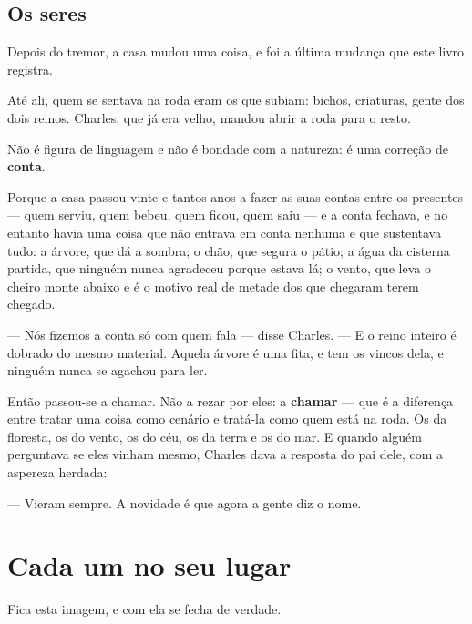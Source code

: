 \documentclass[livro.tex]{subfiles}
\begin{document}
\section{Os seres}

Depois do tremor, a casa mudou uma coisa, e foi a última mudança que este livro registra.

\medskip

Até ali, quem se sentava na roda eram os que subiam: bichos, criaturas, gente dos dois reinos.
Charles, que já era velho, mandou abrir a roda para o resto.

Não é figura de linguagem e não é bondade com a natureza: é uma correção de \textbf{conta}.

Porque a casa passou vinte e tantos anos a fazer as suas contas entre os presentes --- quem
serviu, quem bebeu, quem ficou, quem saiu --- e a conta fechava, e no entanto havia uma coisa que
não entrava em conta nenhuma e que sustentava tudo: a árvore, que dá a sombra; o chão, que segura
o pátio; a água da cisterna partida, que ninguém nunca agradeceu porque estava lá; o vento, que
leva o cheiro monte abaixo e é o motivo real de metade dos que chegaram terem chegado.

--- Nós fizemos a conta só com quem fala --- disse Charles. --- E o reino inteiro é dobrado do
mesmo material. Aquela árvore é uma fita, e tem os vincos dela, e ninguém nunca se agachou para
ler.

\medskip

Então passou-se a chamar. Não a rezar por eles: a \textbf{chamar} --- que é a diferença entre
tratar uma coisa como cenário e tratá-la como quem está na roda. Os da floresta, os do vento, os
do céu, os da terra e os do mar. E quando alguém perguntava se eles vinham mesmo, Charles dava a
resposta do pai dele, com a aspereza herdada:

--- Vieram sempre. A novidade é que agora a gente diz o nome.

\chapter{Cada um no seu lugar}

Fica esta imagem, e com ela se fecha de verdade.
\end{document}
